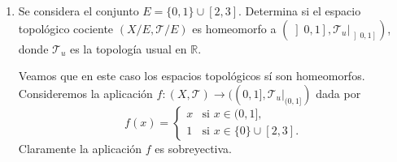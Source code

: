 \documentclass[12pt]{article}
\begin{document}
\begin{ejercicio}
\begin{enumerate}[label=\alph*)]
                Veamos que $(X/A,\mathcal{T}/A)$ no es homeomorfo a $([0,1],\mathcal{T}_u|_{[0,1]})$.
    
                \textbf{PRIMERA FORMA:} Veamos que $(X/A,\mathcal{T}/A)$ es un espacio topológico disconexo mientras que $([0,1],\mathcal{T}_u|_{[0,1]})$ es conexo por ser un intervalo en $\mathbb{R}$ y la conexión es un invariante topológico. De las afirmaciones anteriores solo resta comprobar que $(X/A,\mathcal{T}/A)$ no es conexo. Denotemos $p:X\rightarrow X/A$ la proyección canónica. Observemos que podemos escribir
                \[
                X/A=p(\{0\})\cup p((0,1])
                \]
                y tanto $p(\{0\})$ como $p((0,1])$ son abiertos, disjuntos y no vacíos ya que
                \[
                p^{-1}(p(\{0\}))=A\in\mathcal{T}, \quad p^{-1}(p((0,1]))=(0,1]\in\mathcal{T}, \quad p(\{0\})\cap p((0,1])=\emptyset
                \]
                También se puede razonar que $p(\{0\})$ y $p((0,1])$ son abiertos diciendo que se ha probado en teoría que si $A$ es abierto la aplicación $p:X\rightarrow X/A$ es abierta.
        
                \textbf{SEGUNDA FORMA:} También se puede argumentar que el espacio cociente $(X/A,\mathcal{T}/A)$ no es compacto, luego no puede ser homeomorfo a $([0,1],\mathcal{T}_u|_{[0,1]})$ que sí lo es. En efecto, un recubrimiento por abiertos de $X/A$ es
                \[
                X/A=p(\{0\})\cup\left(\bigcup_{n\in\mathbb{N}}p\left(\left(\frac{1}{n},1\right]\right)\right)
                \]
                y no se puede extraer ningún subrecubrimiento finito.
            
            \item Se considera el conjunto $E = \{0, 1\} \cup \left[2, 3\right]$. Determina si el espacio topológico cociente $(X/E, \mathcal{T}/E)$ es homeomorfo a $\left(\left]0, 1\right], \mathcal{T}_u|_{\left]0, 1\right]}\right)$, donde $\mathcal{T}_u$ es la topología usual en $\mathbb{R}$.

                Veamos que en este caso los espacios topológicos sí son homeomorfos. Consideremos la aplicación $f:(X,\mathcal{T})\rightarrow((0,1],\mathcal{T}_u|_{(0,1]})$ dada por
                \[
                f(x)=\begin{cases}
                x & \text{si } x\in(0,1],\\
                1 & \text{si } x\in\{0\}\cup[2,3].
                \end{cases}
                \]
                Claramente la aplicación $f$ es sobreyectiva.
        

\end{enumerate}
\end{ejercicio}
\end{document}

